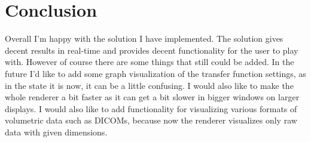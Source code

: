 \documentclass[a4paper, 12pt]{article}
\begin{document}
\newpage

\section{Conclusion}
Overall I'm happy with the solution I have implemented. The solution gives decent results in real-time and provides decent functionality for the user to play with. However of course
there are some things that still could be added. In the future I'd like to add some graph visualization of the transfer function settings, as in the state it is now, it can be a little confusing. 
I would also like to make the whole renderer a bit faster as it can get a bit slower in bigger windows on larger displays. I would also like to add functionality for visualizing various formats of
volumetric data such as DICOMs, because now the renderer visualizes only raw data with given dimensions.



\begin{flushleft}
  
\end{flushleft}

\end{document}
